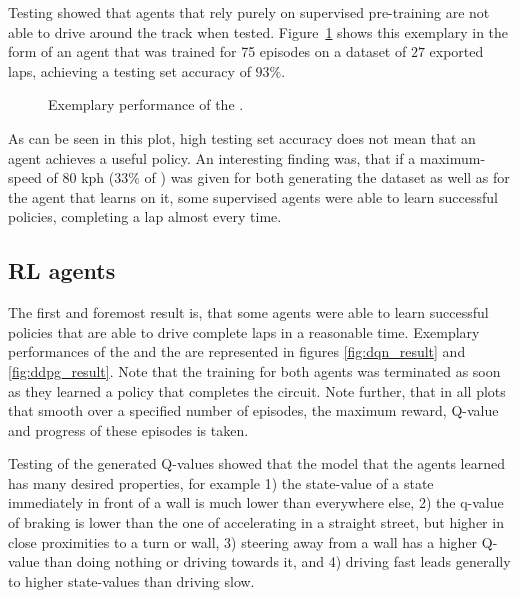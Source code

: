 Testing showed that agents that rely purely on supervised pre-training are not able to drive around the track when tested. Figure~\ref{fig:sv_result} shows this exemplary in the form of an agent that was trained for 75 episodes on a dataset of $27$ exported laps, achieving a testing set accuracy of $93\%$.

\begin{figure}[h]
	{%
		\setlength{\fboxsep}{0pt}%
		\setlength{\fboxrule}{1pt}%
	}%
	\centering
	\caption[Exemplary performance of the ]{Exemplary performance of the .}
	\label{fig:sv_result}
\end{figure}

As can be seen in this plot, high testing set accuracy does not mean that an agent achieves a useful policy. An interesting finding was, that if a maximum-speed of $80$ kph ($33\%$ of ) was given for both generating the dataset as well as for the agent that learns on it, some supervised agents were able to learn successful policies, completing a lap almost every time.

\subsection{RL agents}

The first and foremost result is, that some agents were able to learn successful policies that are able to drive complete laps in a reasonable time. Exemplary performances of the  and the  are represented in figures \ref{fig:dqn_result} and \ref{fig:ddpg_result}. Note that the training for both agents was terminated as soon as they learned a policy that completes the circuit. Note further, that in all plots that smooth over a specified number of episodes, the maximum reward, Q-value and progress of these episodes is taken.

Testing of the generated Q-values showed that the model that the agents learned has many desired properties, for example 1) the state-value of a state immediately in front of a wall is much lower than everywhere else, 2) the q-value of braking is lower than the one of accelerating in a straight street, but higher in close proximities to a turn or wall, 3) steering away from a wall has a higher Q-value than doing nothing or driving towards it, and 4) driving fast leads generally to higher state-values than driving slow. 

